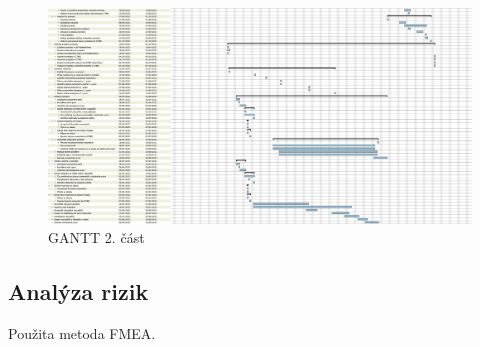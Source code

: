 \documentclass[a4paper, twoside, 11pt]{article}
\begin{document}
 		\begin{figure}[H]
 				\centering
 				\includegraphics[width=1\textwidth]{files/gantt_half2.png} 
				\caption{GANTT 2. část}
				\label{fig:gantt_half2}
 		\end{figure}			
		
	\subsection{Analýza rizik}
	Použita metoda FMEA.
	
\end{document}
